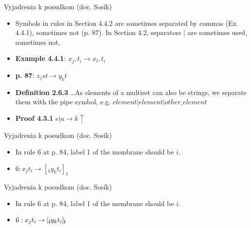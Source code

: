 \begin{frame}[t]{Vyjadrenia k posudkom (doc. Sosík)}
  \begin{itemize}
    \item Symbols in rules in Section 4.4.2 are sometimes separated by commas (Ex. 4.4.1), sometimes not (p. 87). In Section 4.2, separators $|$ are sometimes used, sometimes not.
    \pause
    \item {\bf Example 4.4.1}: $x_j,t_i\rightarrow x_l,t_i$
    \item {\bf p. 87}: $z_jst\rightarrow y_kt$
    \item {\bf Definition 2.6.3} \dots As elements of a multiset can also be strings, we separate them with the pipe symbol, e.g. $element|element|other\_element$
    \item {\bf Proof 4.3.1} $e|a\rightarrow k\uparrow$
  \end{itemize}
\end{frame}

\begin{frame}[t]{Vyjadrenia k posudkom (doc. Sosík)}
  \begin{itemize}
    \item In rule 6 at p. 84, label 1 of the membrane should be $i$.
    \item $6: x_jt_i\rightarrow [_1 y_kt_i]_1$
  \end{itemize}
\end{frame}

\begin{frame}[t]{Vyjadrenia k posudkom (doc. Sosík)}
  \begin{itemize}
    \item In rule 6 at p. 84, label 1 of the membrane should be $i$.
    \item $6: x_jt_i\rightarrow [_{\bf i} y_kt_i ]_{\bf i}$
  \end{itemize}
\end{frame}

